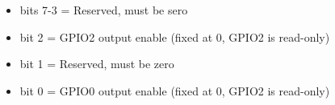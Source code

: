 \begin{itemize}
\item bits 7-3 = Reserved, must be sero
\item bit 2 = GPIO2 output enable (fixed at 0, GPIO2 is read-only)
\item bit 1 = Reserved, must be zero
\item bit 0 = GPIO0 output enable (fixed at 0, GPIO2 is read-only)
\end{itemize}
